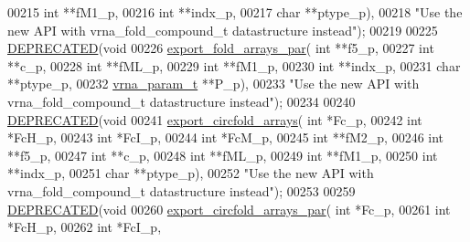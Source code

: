 \begin{DoxyCode}
00215                     \textcolor{keywordtype}{int} **fM1\_p,
00216                     \textcolor{keywordtype}{int} **indx\_p,
00217                     \textcolor{keywordtype}{char} **ptype\_p),
00218 \textcolor{stringliteral}{"Use the new API with vrna\_fold\_compound\_t datastructure instead"});
00219 
00225 \mbox{\hyperlink{fold_8h_aab347a3c03fbe8e7319551b9fa0cce4a}{DEPRECATED}}(\textcolor{keywordtype}{void}
00226 \mbox{\hyperlink{group__mfe__fold__single_ga6606ec0ec964ea506fdadb997a1a5328}{export\_fold\_arrays\_par}}( \textcolor{keywordtype}{int} **f5\_p,
00227                         \textcolor{keywordtype}{int} **c\_p,
00228                         \textcolor{keywordtype}{int} **fML\_p,
00229                         \textcolor{keywordtype}{int} **fM1\_p,
00230                         \textcolor{keywordtype}{int} **indx\_p,
00231                         \textcolor{keywordtype}{char} **ptype\_p,
00232                         \mbox{\hyperlink{group__energy__parameters_structvrna__param__s}{vrna\_param\_t}} **P\_p),
00233 \textcolor{stringliteral}{"Use the new API with vrna\_fold\_compound\_t datastructure instead"});
00234 
00240 \mbox{\hyperlink{fold_8h_aab347a3c03fbe8e7319551b9fa0cce4a}{DEPRECATED}}(\textcolor{keywordtype}{void}
00241 \mbox{\hyperlink{group__mfe__fold__single_ga04d5d639fd4473ca766436a9bae5665c}{export\_circfold\_arrays}}( \textcolor{keywordtype}{int} *Fc\_p,
00242                         \textcolor{keywordtype}{int} *FcH\_p,
00243                         \textcolor{keywordtype}{int} *FcI\_p,
00244                         \textcolor{keywordtype}{int} *FcM\_p,
00245                         \textcolor{keywordtype}{int} **fM2\_p,
00246                         \textcolor{keywordtype}{int} **f5\_p,
00247                         \textcolor{keywordtype}{int} **c\_p,
00248                         \textcolor{keywordtype}{int} **fML\_p,
00249                         \textcolor{keywordtype}{int} **fM1\_p,
00250                         \textcolor{keywordtype}{int} **indx\_p,
00251                         \textcolor{keywordtype}{char} **ptype\_p),
00252 \textcolor{stringliteral}{"Use the new API with vrna\_fold\_compound\_t datastructure instead"});
00253 
00259 \mbox{\hyperlink{fold_8h_aab347a3c03fbe8e7319551b9fa0cce4a}{DEPRECATED}}(\textcolor{keywordtype}{void}
00260 \mbox{\hyperlink{group__mfe__fold__single_ga004bb901e7fd2f8d5ae68f9530318ce1}{export\_circfold\_arrays\_par}}( \textcolor{keywordtype}{int} *Fc\_p,
00261                             \textcolor{keywordtype}{int} *FcH\_p,
00262                             \textcolor{keywordtype}{int} *FcI\_p,

\end{DoxyCode}
